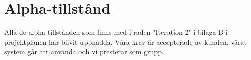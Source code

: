 \section{Alpha-tillstånd}
Alla de alpha-tillstånden som finns med i raden "Iteration 2" i bilaga B i projektplanen har blivit uppnådda. Våra krav är accepterade av kunden, vårat system går att använda och vi presterar som grupp.   